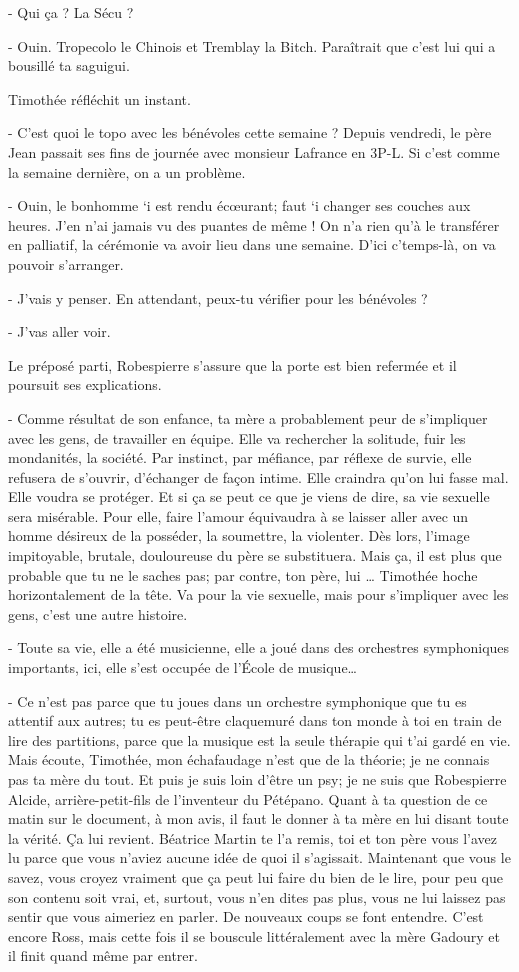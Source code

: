 - Qui ça ? La Sécu ?

- Ouin. Tropecolo le Chinois et Tremblay la Bitch. Paraîtrait que c’est lui qui a bousillé ta saguigui.

Timothée réfléchit un instant.

- C’est quoi le topo avec les bénévoles cette semaine ? Depuis vendredi, le père Jean passait ses fins de journée avec monsieur Lafrance en 3P-L. Si c’est comme la semaine dernière, on a un problème.

- Ouin, le bonhomme ‘i est rendu écœurant; faut ‘i changer ses couches aux heures. J’en n’ai jamais vu des puantes de même ! On n’a rien qu’à le transférer en palliatif, la cérémonie va avoir lieu dans une semaine. D’ici c’temps-là, on va pouvoir s’arranger.

- J’vais y penser. En attendant, peux-tu vérifier pour les bénévoles ?

- J’vas aller voir.

Le préposé parti, Robespierre s’assure que la porte est bien refermée et il poursuit ses explications.

- Comme résultat de son enfance, ta mère a probablement peur de s’impliquer avec les gens, de travailler en équipe. Elle va rechercher la solitude, fuir les mondanités, la société. Par instinct, par méfiance, par réflexe de survie, elle refusera de s’ouvrir, d’échanger de façon intime. Elle craindra qu’on lui fasse mal. Elle voudra se protéger. Et si ça se peut ce que je viens de dire, sa vie sexuelle sera misérable. Pour elle, faire l’amour équivaudra à se laisser aller avec un homme désireux de la posséder, la soumettre, la violenter. Dès lors, l’image impitoyable, brutale, douloureuse du père se substituera. Mais ça, il est plus que probable que tu ne le saches pas; par contre, ton père, lui …
Timothée hoche horizontalement de la tête. Va pour la vie sexuelle, mais pour s’impliquer avec les gens, c’est une autre histoire.

- Toute sa vie, elle a été musicienne, elle a joué dans des orchestres symphoniques importants, ici, elle s’est occupée de l’École de musique…

- Ce n’est pas parce que tu joues dans un orchestre symphonique que tu es attentif aux autres; tu es peut-être claquemuré dans ton monde à toi en train de lire des partitions, parce que la musique est la seule thérapie qui t’ai gardé en vie. Mais écoute, Timothée, mon échafaudage n’est que de la théorie; je ne connais pas ta mère du tout. Et puis je suis loin d’être un psy; je ne suis que Robespierre Alcide, arrière-petit-fils de l’inventeur du Pétépano. Quant à ta question de ce matin sur le document, à mon avis, il faut le donner à ta mère en lui disant toute la vérité. Ça lui revient. Béatrice Martin te l’a remis, toi et ton père vous l’avez lu parce que vous n’aviez aucune idée de quoi il s’agissait. Maintenant que vous le savez, vous croyez vraiment que ça peut lui faire du bien de le lire, pour peu que son contenu soit vrai, et, surtout, vous n’en dites pas plus, vous ne lui laissez pas sentir que vous aimeriez en parler.
De nouveaux coups se font entendre. C’est encore Ross, mais cette fois il se bouscule littéralement avec la mère Gadoury et il finit quand même par entrer.

